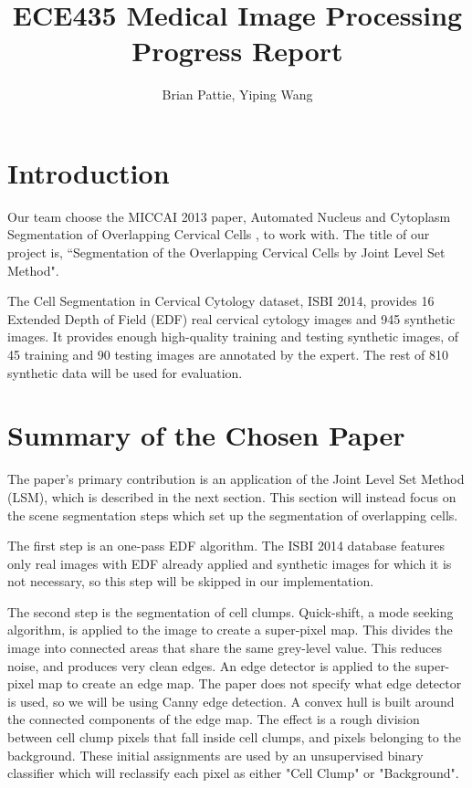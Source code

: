 \documentclass[12pt, letter]{article}
\newcommand{\courseName}{ECE435 Medical Image Processing}
\newcommand{\assignName}{Progress Report}
\begin{document}
\pagestyle{titlesec_assignment}

\title{\courseName\\\assignName}
\author{Brian Pattie, Yiping Wang}
\maketitle



\section{Introduction}

Our team choose the MICCAI 2013 paper, Automated Nucleus and Cytoplasm Segmentation of Overlapping Cervical Cells \cite{main}, to work with. The title of our project is, ``Segmentation of the Overlapping Cervical Cells by Joint Level Set Method". 

The Cell Segmentation in Cervical Cytology dataset, ISBI 2014, provides 16 Extended Depth of Field (EDF) real cervical cytology images and 945 synthetic images. It provides enough high-quality training and testing synthetic images, of 45 training and 90 testing images are annotated by the expert. The rest of 810 synthetic data will be used for evaluation. 


\section{Summary of the Chosen Paper}
The paper's primary contribution is an application of the Joint Level Set Method (LSM), which is described in the next section. This section will instead focus on the scene segmentation steps which set up the segmentation of overlapping cells.

The first step is an one-pass EDF algorithm. The ISBI 2014 database features only real images with EDF already applied and synthetic images for which it is not necessary, so this step will be skipped in our implementation.

The second step is the segmentation of cell clumps.  Quick-shift, a mode seeking algorithm, is applied to the image to create a super-pixel map. This divides the image into connected areas that share the same grey-level value. This reduces noise, and produces very clean edges. An edge detector is applied to the super-pixel map to create an edge map. The paper does not specify what edge detector is used, so we will be using Canny edge detection. A convex hull is built around the connected components of the edge map. The effect is a rough division between cell clump pixels that fall inside cell clumps, and pixels belonging to the background. These initial assignments are used by an unsupervised binary classifier which will reclassify each pixel as either "Cell Clump" or "Background".
\end{document}
